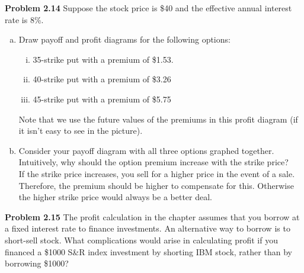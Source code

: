 \documentclass[12pt]{article}
\newcommand{\problem}[1]{\bigskip \noindent \textbf{Problem #1}}
\theoremstyle{plain}
\begin{document}
\problem{2.14} Suppose the stock price is \$40 and the effective annual interest rate is 8\%. 
\begin{enumerate}[(a)]
\item Draw payoff and profit diagrams for the following options:
\begin{enumerate}[(i)]
\item 35-strike put with a premium of \$1.53.
\item 40-strike put with a premium of \$3.26
\item 45-strike put with a premium of \$5.75
\end{enumerate}

\begin{center}
\end{center}
Note that we use the future values of the premiums in this profit diagram (if it isn't easy to see in the picture).

\item Consider your payoff diagram with all three options graphed together. Intuitively, why should the option premium increase with the strike price?\\

If the strike price increases, you sell for a higher price in the event of a sale. Therefore, the premium should be higher to compensate for this. Otherwise the higher strike price would always be a better deal.
\end{enumerate}

\problem{2.15} The profit calculation in the chapter assumes that you borrow at a fixed interest rate to finance investments. An alternative way to borrow is to short-sell stock. What complications would arise in calculating profit if you financed a \$1000 S\&R index investment by shorting IBM stock, rather than by borrowing \$1000?\\
\end{document}

